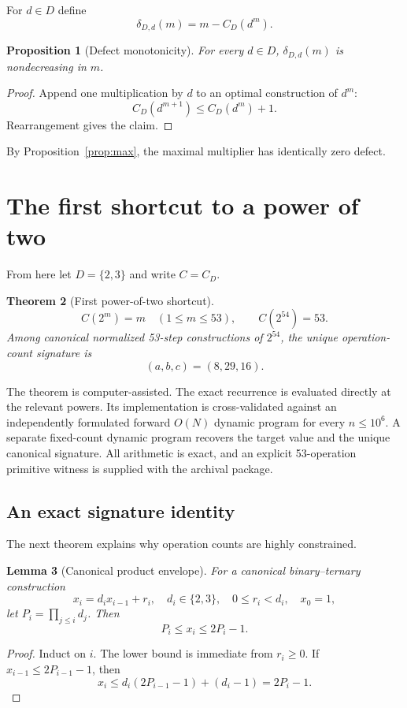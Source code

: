 \documentclass[11pt]{article}
\newtheorem{theorem}{Theorem}[section]
\newtheorem{proposition}[theorem]{Proposition}
\newtheorem{lemma}[theorem]{Lemma}
\begin{document}
For $d\in D$ define
\[
 \delta_{D,d}(m)=m-C_D(d^m).
\]
\begin{proposition}[Defect monotonicity]\label{prop:defectmono}
For every $d\in D$, $\delta_{D,d}(m)$ is nondecreasing in $m$.
\end{proposition}
\begin{proof}
Append one multiplication by $d$ to an optimal construction of $d^m$:
\[
 C_D(d^{m+1})\le C_D(d^m)+1.
\]
Rearrangement gives the claim.
\end{proof}
By Proposition~\ref{prop:max}, the maximal multiplier has identically zero defect.

\section{The first shortcut to a power of two}\label{sec:shortcut}
From here let $D=\{2,3\}$ and write $C=C_D$.

\begin{theorem}[First power-of-two shortcut]\label{thm:54}
\[
 C(2^m)=m\quad(1\le m\le53),
\qquad
 C(2^{54})=53.
\]
Among canonical normalized 53-step constructions of $2^{54}$, the unique operation-count signature is
\[
 \boxed{(a,b,c)=(8,29,16)}.
\]
\end{theorem}
The theorem is computer-assisted. The exact recurrence is evaluated directly at the relevant powers. Its implementation is cross-validated against an independently formulated forward $O(N)$ dynamic program for every $n\le10^6$. A separate fixed-count dynamic program recovers the target value and the unique canonical signature. All arithmetic is exact, and an explicit 53-operation primitive witness is supplied with the archival package.

\subsection{An exact signature identity}
The next theorem explains why operation counts are highly constrained.

\begin{lemma}[Canonical product envelope]\label{lem:envelope}
For a canonical binary--ternary construction
\[
 x_i=d_i x_{i-1}+r_i,
\quad d_i\in\{2,3\},\quad0\le r_i<d_i,
\quad x_0=1,
\]
let $P_i=\prod_{j\le i}d_j$. Then
\[
 \boxed{P_i\le x_i\le2P_i-1.}
\]
\end{lemma}
\begin{proof}
Induct on $i$. The lower bound is immediate from $r_i\ge0$. If $x_{i-1}\le2P_{i-1}-1$, then
\[
 x_i\le d_i(2P_{i-1}-1)+(d_i-1)=2P_i-1.
\]
\end{proof}
\end{document}
